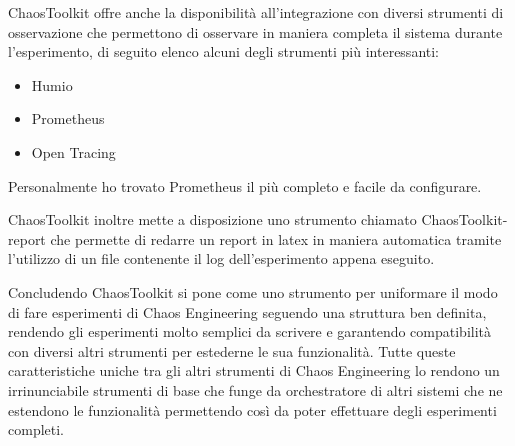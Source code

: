 ChaosToolkit offre anche la disponibilità all'integrazione con diversi strumenti di osservazione che permettono di osservare in maniera completa il sistema durante l'esperimento, di seguito elenco alcuni degli strumenti più interessanti:
\begin{itemize}
    \item Humio
    \item Prometheus
    \item Open Tracing
\end{itemize}
Personalmente ho trovato Prometheus il più completo e facile da configurare.

ChaosToolkit inoltre mette a disposizione uno strumento chiamato ChaosToolkit-report che permette di redarre un report in latex in maniera automatica tramite l'utilizzo di un file contenente il log dell'esperimento appena eseguito.

Concludendo ChaosToolkit si pone come uno strumento per uniformare il modo di fare esperimenti di Chaos Engineering seguendo una struttura ben definita, rendendo gli esperimenti molto semplici da scrivere e garantendo compatibilità con diversi altri strumenti per estederne le sua funzionalità.
Tutte queste caratteristiche uniche tra gli altri strumenti di Chaos Engineering lo rendono un irrinunciabile strumenti di base che funge da orchestratore di altri sistemi che ne estendono le funzionalità permettendo così da poter effettuare degli esperimenti completi.
